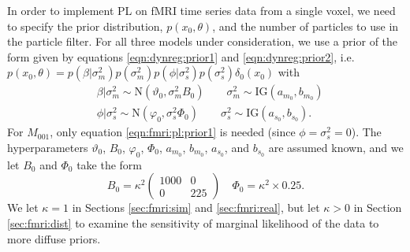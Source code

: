 In order to implement PL on fMRI time series data from a single voxel, we need to specify the prior distribution, $p(x_0,\theta)$, and the number of particles to use in the particle filter. For all three models under consideration, we use a prior of the form given by equations \eqref{eqn:dynreg:prior1} and \eqref{eqn:dynreg:prior2}, i.e. $p(x_0, \theta) = p(\beta|\sigma^2_m)p(\sigma^2_m)p(\phi|\sigma^2_s)p(\sigma^2_s)\delta_0(x_0)$ with
\begin{align}
&\beta|\sigma^2_m \sim \mbox{N}(\vartheta_0, \sigma^2_mB_0) \qquad \sigma^2_m \sim \mbox{IG}(a_{m_0}, b_{m_0}) \label{eqn:fmri:pl:prior1} \\
&\phi|\sigma^2_s \sim \mbox{N}(\varphi_0, \sigma^2_s\Phi_0) \qquad \sigma^2_s \sim \mbox{IG}(a_{s_0}, b_{s_0}). \label{eqn:fmri:pl:prior2}
\end{align}
For $M_{001}$, only equation \eqref{eqn:fmri:pl:prior1} is needed (since $\phi = \sigma^2_s = 0$). The hyperparameters $\vartheta_0$, $B_0$, $\varphi_0$, $\Phi_0$, $a_{m_0}$, $b_{m_0}$, $a_{s_0}$, and $b_{s_0}$ are assumed known, and we let $B_0$ and $\Phi_0$ take the form
\begin{equation}
B_0 = \kappa^2 \left(\begin{array}{cc} 1000 & 0 \\ 0 & 225 \end{array}\right) \quad \Phi_0 = \kappa^2\times0.25. \label{eqn:fmri:kappa}
\end{equation}
We let $\kappa = 1$ in Sections \ref{sec:fmri:sim} and \ref{sec:fmri:real}, but let $\kappa > 0$ in Section \ref{sec:fmri:dist} to examine the sensitivity of marginal likelihood of the data to more diffuse priors.

